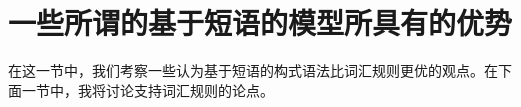 
\addlines
\section{一些所谓的基于短语的模型所具有的优势}
\label{Abschnitt-Stoepselei}
%

    在这一节中，我们考察一些认为基于短语的构式语法比词汇规则更优的观点。在下面一节中，我将讨论支持词汇规则的论点。

